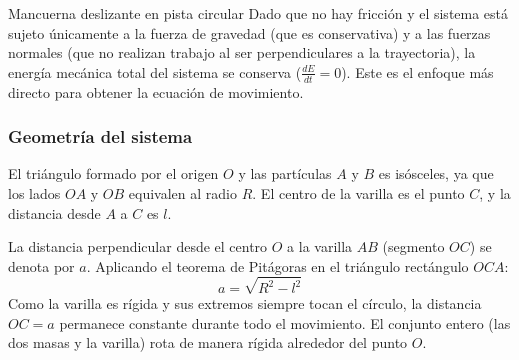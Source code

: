 \begin{solucion}{Mancuerna deslizante en pista circular}
Dado que no hay fricción y el sistema está sujeto únicamente a la fuerza de gravedad (que es conservativa) y a las fuerzas normales (que no realizan trabajo al ser perpendiculares a la trayectoria), la energía mecánica total del sistema se conserva ($\frac{dE}{dt} = 0$). Este es el enfoque más directo para obtener la ecuación de movimiento.

\subsubsection*{Geometría del sistema}
El triángulo formado por el origen $O$ y las partículas $A$ y $B$ es isósceles, ya que los lados $OA$ y $OB$ equivalen al radio $R$. El centro de la varilla es el punto $C$, y la distancia desde $A$ a $C$ es $l$.

\begin{center}
\end{center}

La distancia perpendicular desde el centro $O$ a la varilla $AB$ (segmento $OC$) se denota por $a$. Aplicando el teorema de Pitágoras en el triángulo rectángulo $OCA$:
$$a = \sqrt{R^2 - l^2}$$
Como la varilla es rígida y sus extremos siempre tocan el círculo, la distancia $OC = a$ permanece constante durante todo el movimiento. El conjunto entero (las dos masas y la varilla) rota de manera rígida alrededor del punto $O$.


\end{solucion}
